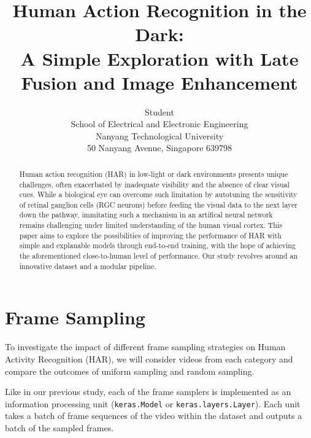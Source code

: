 \documentclass[letterpaper]{article} %
\title{
  Human Action Recognition in the Dark: \\
  A Simple Exploration with Late Fusion and Image Enhancement
}
\author{
  Student \\
  School of Electrical and Electronic Engineering \\
  Nanyang Technological University \\
  50 Nanyang Avenue, Singapore 639798
}
\begin{document}
\maketitle

\begin{abstract}
Human action recognition (HAR) in low-light or dark environments 
presents unique challenges, often exacerbated by inadequate visibility 
and the absence of clear visual cues.
While a biological eye can overcome such limitation
by autotuning the sensitivity of retinal ganglion cells (RGC neurons)
before feeding the visual data to the next layer down the pathway,
immitating such a mechanism in an artifical neural network
remains challenging under limited understanding of the human visual cortex.
This paper aims to explore the possibilities of
improving the performance of HAR with simple and explanable models
through end-to-end training, with the hope of achieving the 
aforementioned close-to-human level of performance.
Our study revolves around an innovative dataset and a modular pipeline.
\end{abstract}

\section{Frame Sampling}
To investigate the impact of different frame sampling strategies 
on Human Activity Recognition (HAR), we will consider 
videos from each category and 
compare the outcomes of uniform sampling and random sampling. 

Like in our previous study, 
each of the frame samplers is implemented as 
an information processing unit 
(\lstinline|keras.Model| or \lstinline|keras.layers.Layer|).
Each unit takes a batch of frame sequences of the video
within the dataset and outputs a batch of the sampled frames.
\end{document}
